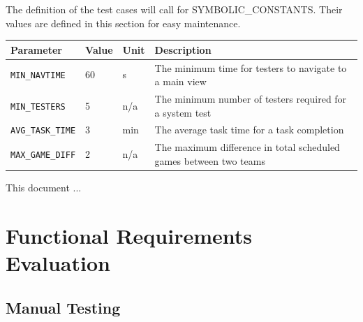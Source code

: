 \documentclass[12pt, titlepage]{article}
\begin{document}
The definition of the test cases will call for SYMBOLIC\_CONSTANTS.
Their values are defined in this section for easy maintenance.
\begin{longtable}{|l|l|l|p{5cm}|}
    \hline
    Parameter & Value & Unit & Description \\
    \hline
    \label{MIN_NAVTIME} \texttt{MIN\_NAVTIME} & 60 & s & The minimum time for testers to navigate to a main view \\
    \hline
    \label{MIN_TESTERS} \texttt{MIN\_TESTERS} & 5 & n/a & The minimum number of testers required for a system test \\
    \hline
    \label{AVG_TASK_TIME} \texttt{AVG\_TASK\_TIME} & 3 & min & The average task time for a task completion \\
    \hline
    \label{MAX_GAME_DIFF} \texttt{MAX\_GAME\_DIFF} & 2 & n/a & The maximum difference in total scheduled games between two teams \\
    \hline
\end{longtable}

\newpage

\tableofcontents

\listoftables %

\listoffigures %

\newpage


This document ...

\section{Functional Requirements Evaluation}

\subsection{Manual Testing}
\end{document}
